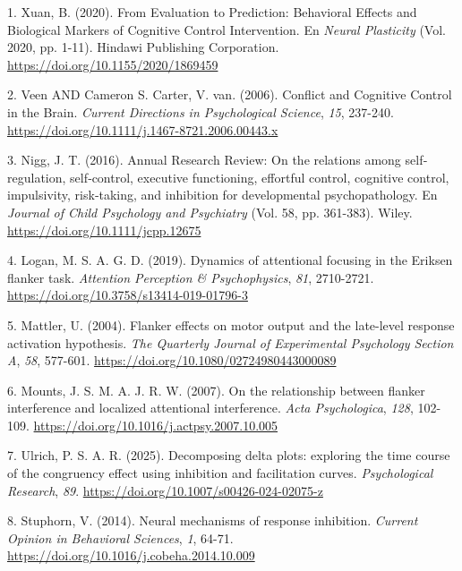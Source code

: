 \documentclass[
  spanish,
  10pt,
]{article}
\newlength{\cslhangindent}
\newenvironment{CSLReferences}[2] %
 {\begin{list}{}{%
  \setlength{\itemindent}{0pt}
  \setlength{\leftmargin}{0pt}
  \setlength{\parsep}{0pt}
  \ifodd #1
   \setlength{\leftmargin}{\cslhangindent}
   \setlength{\itemindent}{-1\cslhangindent}
  \fi
  \setlength{\itemsep}{#2\baselineskip}}}
 {\end{list}}
\begin{document}
\label{refs}
\begin{CSLReferences}{1}{0}
1. Xuan, B. (2020). From Evaluation to Prediction: Behavioral Effects
and Biological Markers of Cognitive Control Intervention. En
\emph{Neural Plasticity} (Vol. 2020, pp. 1-11). Hindawi Publishing
Corporation. \url{https://doi.org/10.1155/2020/1869459}

2. Veen AND Cameron S. Carter, V. van. (2006). Conflict and Cognitive
Control in the Brain. \emph{Current Directions in Psychological
Science}, \emph{15}, 237-240.
\url{https://doi.org/10.1111/j.1467-8721.2006.00443.x}

3. Nigg, J. T. (2016). Annual Research Review: On the relations among
self‐regulation, self‐control, executive functioning, effortful control,
cognitive control, impulsivity, risk‐taking, and inhibition for
developmental psychopathology. En \emph{Journal of Child Psychology and
Psychiatry} (Vol. 58, pp. 361-383). Wiley.
\url{https://doi.org/10.1111/jcpp.12675}

4. Logan, M. S. A. G. D. (2019). Dynamics of attentional focusing in the
Eriksen flanker task. \emph{Attention Perception \& Psychophysics},
\emph{81}, 2710-2721. \url{https://doi.org/10.3758/s13414-019-01796-3}

5. Mattler, U. (2004). Flanker effects on motor output and the
late-level response activation hypothesis. \emph{The Quarterly Journal
of Experimental Psychology Section A}, \emph{58}, 577-601.
\url{https://doi.org/10.1080/02724980443000089}

6. Mounts, J. S. M. A. J. R. W. (2007). On the relationship between
flanker interference and localized attentional interference. \emph{Acta
Psychologica}, \emph{128}, 102-109.
\url{https://doi.org/10.1016/j.actpsy.2007.10.005}

7. Ulrich, P. S. A. R. (2025). Decomposing delta plots: exploring the
time course of the congruency effect using inhibition and facilitation
curves. \emph{Psychological Research}, \emph{89}.
\url{https://doi.org/10.1007/s00426-024-02075-z}

8. Stuphorn, V. (2014). Neural mechanisms of response inhibition.
\emph{Current Opinion in Behavioral Sciences}, \emph{1}, 64-71.
\url{https://doi.org/10.1016/j.cobeha.2014.10.009}


\end{CSLReferences}
\end{document}
